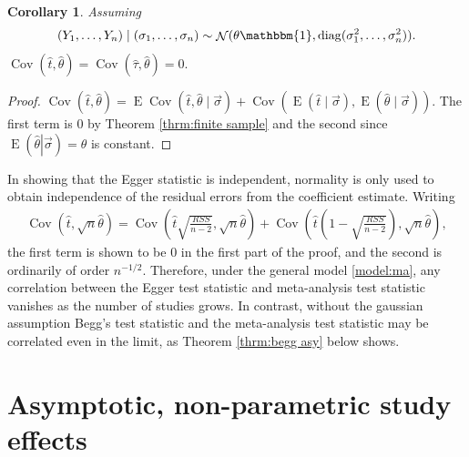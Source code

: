 \documentclass[12pt]{article}
\newtheorem{corollary}[theorem]{Corollary}
\newcommand{\y}{Y}
\renewcommand{\t}{t}
\newcommand{\thetahat}{\hat{\theta}}
\DeclareMathOperator{\E}{E}
\DeclareMathOperator{\cov}{Cov}
\DeclareMathOperator{\diag}{diag}
\DeclareMathOperator{\N}{\mathcal{N}}
\begin{document}
\begin{corollary}
  Assuming
   \begin{align}
    (\y_1,\ldots,\y_n) \mid (\sigma_1,\ldots,\sigma_n) \sim \N(\theta\mathbbm{1},\diag(\sigma_1^2,\ldots,\sigma_n^2)).
  \end{align}
$\cov(\hat\t,\thetahat)=\cov(\hat\tau,\thetahat)=0.$
\end{corollary}
\begin{proof}
  $\cov(\hat\t,\hat\theta) = \E\cov(\hat\t,\hat\theta\mid\vec\sigma) + \cov\left(\E\left(\hat\t\mid\vec\sigma\right), \E\left(\hat\theta\mid\vec\sigma\right)\right)$. The first term is $0$ by Theorem \ref{thrm:finite sample} and the second since $\E\left(\left.\hat\theta\right|\vec\sigma\right)=\theta$ is constant.
\end{proof}



In showing that the Egger statistic is independent, normality is only
used to obtain independence of the residual errors from the
coefficient estimate. Writing
\begin{align}
  \cov(\hat\t,\sqrt{n}\hat\theta) =  \cov\left(\hat\t\sqrt{\frac{RSS}{n-2}},\sqrt{n}\hat\theta\right) + \cov\left(\hat\t\left(1-\sqrt{\frac{RSS}{n-2}}\right),\sqrt{n}\hat\theta\right),
\end{align}
the first term is shown to be $0$ in the first part of the proof, and the second is
ordinarily of order $n^{-1/2}$. Therefore, under the general model
\eqref{model:ma}, any correlation between the Egger test statistic and
meta-analysis test statistic vanishes as the number of
studies grows. %
In contrast, without 
the gaussian assumption Begg's test statistic and the meta-analysis test
statistic may be correlated even in the limit, as Theorem \ref{thrm:begg asy}
below shows.






\section{Asymptotic, non-parametric study effects}
\label{sec:asy}
\end{document}
